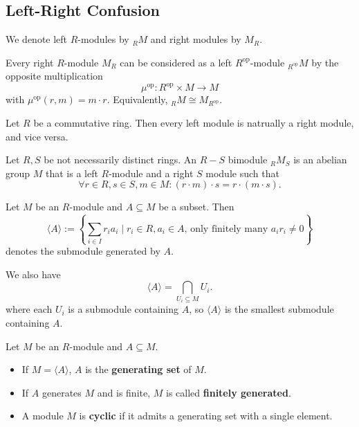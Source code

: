 \subsection*{Left-Right Confusion}
We denote left $R$-modules by $_R M$ and right modules by $M_R$.
\begin{remark}
    Every right $R$-module $M_R$ can be considered as a left $R^\text{op}$-module $_{R^\text{op}}M$ by the opposite multiplication \[
        \mu^\text{op}: R^\text{op} \times M \to M
    \] with $\mu^\text{op}(r,m)=m \cdot r.$ Equivalently, $_R M \cong M_{R^\text{op}}$.
\end{remark}
\begin{lemma}
    Let $R$ be a commutative ring. Then every left module is natrually a right module, and vice versa.
\end{lemma}
\begin{definition}[Bimodule]
    Let $R,S$ be not necessarily distinct rings. An $R-S$ bimodule $_R M_S$ is an abelian group $M$ that is a left $R$-module and a right $S$ module such that \[
    \forall r \in R, s \in S, m \in M: (r\cdot m) \cdot s=r\cdot (m \cdot s)
    .\] 
\end{definition}
\begin{definition}
    Let $M$ be an $R$-module and $A \subseteq M$ be a subset. Then \[
        \langle A \rangle := \left\{\sum_{i \in I} r_i a_i \mid r_i \in R, a_i \in A, \, \text{only finitely many } a_i r_i \neq 0 \right\} 
    \] denotes the submodule generated by $A$.
\end{definition}
\begin{remark}
    We also have \[
        \langle A \rangle = \bigcap_{U_i \subseteq M} U_i
    .\] where each $U_i$ is a submodule containing $A$, so $\langle A \rangle$ is the smallest submodule containing $A$.
\end{remark}
\begin{definition}
    Let $M$ be an $R$-module and $A \subseteq M$.
    \begin{itemize}
        \item If $M = \langle A \rangle$, $A$ is the \textbf{generating set} of $M$. 
        \item If $A$ generates $M$ and is finite, $M$ is called \textbf{finitely generated}.
        \item A module $M$ is \textbf{cyclic} if it admits a generating set with a single element.
    \end{itemize}
\end{definition}

